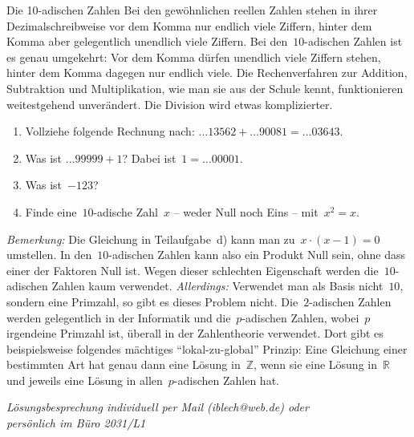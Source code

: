 \documentclass{../zirkelblatt1415}
\begin{document}
\begin{aufgabe}{Die 10-adischen Zahlen}
Bei den gewöhnlichen reellen Zahlen stehen in ihrer Dezimalschreibweise vor dem
Komma nur endlich viele Ziffern, hinter dem Komma aber gelegentlich unendlich
viele Ziffern. Bei den~$10$-adischen Zahlen ist es genau umgekehrt: Vor dem
Komma dürfen unendlich viele Ziffern stehen, hinter dem Komma dagegen nur
endlich viele. Die Rechenverfahren zur Addition, Subtraktion und
Multiplikation, wie man sie aus der Schule kennt, funktionieren weitestgehend
unverändert. Die Division wird etwas komplizierter.
\begin{enumerate}
\item Vollziehe folgende Rechnung nach:
$\ldots 13562 + \ldots 90081 = \ldots 03643$.
\item Was ist $\ldots 99999 + 1$? Dabei ist~$1 = \ldots 00001$.
\item Was ist~$-123$?
\item Finde eine~$10$-adische Zahl~$x$ -- weder Null noch Eins -- mit~$x^2 = x$.
\end{enumerate}
{\scriptsize
\emph{Bemerkung:} Die Gleichung in Teilaufgabe~d) kann man zu~$x \cdot (x-1) =
0$ umstellen. In den~$10$-adischen Zahlen kann also ein Produkt Null sein, ohne
dass einer der Faktoren Null ist. Wegen dieser schlechten Eigenschaft werden
die~$10$-adischen Zahlen kaum verwendet. \emph{Allerdings:} Verwendet man als
Basis nicht~$10$, sondern eine Primzahl, so gibt es dieses Problem nicht.
Die~$2$-adischen Zahlen werden gelegentlich in der Informatik und
die~$p$-adischen Zahlen, wobei~$p$ irgendeine Primzahl ist, überall in der
Zahlentheorie verwendet. Dort gibt es beispielsweise folgendes mächtiges
"`lokal-zu-global"' Prinzip: Eine Gleichung einer bestimmten Art hat genau dann
eine Lösung in~$\mathbb{Z}$, wenn sie eine Lösung in~$\mathbb{R}$ und jeweils
eine Lösung in allen~$p$-adischen Zahlen hat.\par}
\end{aufgabe}

\begin{center}
  \emph{
  Lösungsbesprechung individuell per Mail (iblech@web.de) oder \\
  persönlich im Büro 2031/L1}
\end{center}
\end{document}
